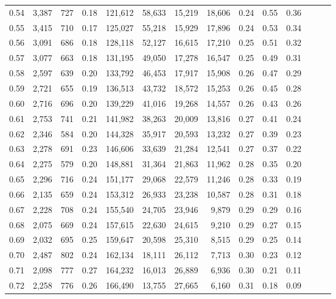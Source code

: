 \begin{tabular}{rrrrrrrrrrrrrr}
0.54 &  3,387 &  727 &  0.18 &  121,612 &   58,633 &  15,219 &  18,606 &  0.24 &  0.55 &      0.36 \\
0.55 &  3,415 &  710 &  0.17 &  125,027 &   55,218 &  15,929 &  17,896 &  0.24 &  0.53 &      0.34 \\
0.56 &  3,091 &  686 &  0.18 &  128,118 &   52,127 &  16,615 &  17,210 &  0.25 &  0.51 &      0.32 \\
0.57 &  3,077 &  663 &  0.18 &  131,195 &   49,050 &  17,278 &  16,547 &  0.25 &  0.49 &      0.31 \\
0.58 &  2,597 &  639 &  0.20 &  133,792 &   46,453 &  17,917 &  15,908 &  0.26 &  0.47 &      0.29 \\
0.59 &  2,721 &  655 &  0.19 &  136,513 &   43,732 &  18,572 &  15,253 &  0.26 &  0.45 &      0.28 \\
0.60 &  2,716 &  696 &  0.20 &  139,229 &   41,016 &  19,268 &  14,557 &  0.26 &  0.43 &      0.26 \\
0.61 &  2,753 &  741 &  0.21 &  141,982 &   38,263 &  20,009 &  13,816 &  0.27 &  0.41 &      0.24 \\
0.62 &  2,346 &  584 &  0.20 &  144,328 &   35,917 &  20,593 &  13,232 &  0.27 &  0.39 &      0.23 \\
0.63 &  2,278 &  691 &  0.23 &  146,606 &   33,639 &  21,284 &  12,541 &  0.27 &  0.37 &      0.22 \\
0.64 &  2,275 &  579 &  0.20 &  148,881 &   31,364 &  21,863 &  11,962 &  0.28 &  0.35 &      0.20 \\
0.65 &  2,296 &  716 &  0.24 &  151,177 &   29,068 &  22,579 &  11,246 &  0.28 &  0.33 &      0.19 \\
0.66 &  2,135 &  659 &  0.24 &  153,312 &   26,933 &  23,238 &  10,587 &  0.28 &  0.31 &      0.18 \\
0.67 &  2,228 &  708 &  0.24 &  155,540 &   24,705 &  23,946 &   9,879 &  0.29 &  0.29 &      0.16 \\
0.68 &  2,075 &  669 &  0.24 &  157,615 &   22,630 &  24,615 &   9,210 &  0.29 &  0.27 &      0.15 \\
0.69 &  2,032 &  695 &  0.25 &  159,647 &   20,598 &  25,310 &   8,515 &  0.29 &  0.25 &      0.14 \\
0.70 &  2,487 &  802 &  0.24 &  162,134 &   18,111 &  26,112 &   7,713 &  0.30 &  0.23 &      0.12 \\
0.71 &  2,098 &  777 &  0.27 &  164,232 &   16,013 &  26,889 &   6,936 &  0.30 &  0.21 &      0.11 \\
0.72 &  2,258 &  776 &  0.26 &  166,490 &   13,755 &  27,665 &   6,160 &  0.31 &  0.18 &      0.09 \\

\end{tabular}
